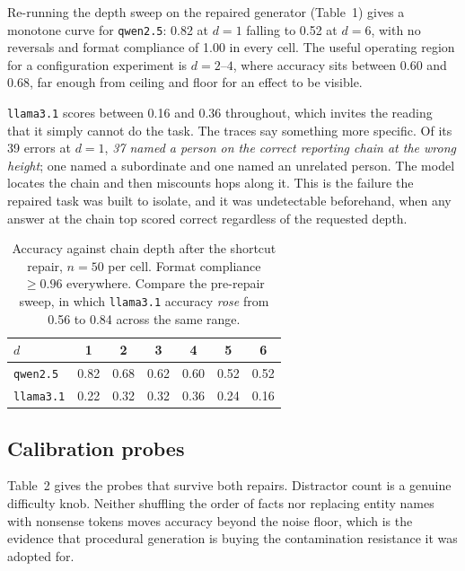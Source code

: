 \documentclass[10pt,twocolumn]{article}
\begin{document}
Re-running the depth sweep on the repaired generator (Table~1) gives a monotone curve for
\texttt{qwen2.5}: 0.82 at $d{=}1$ falling to 0.52 at $d{=}6$, with no reversals and format
compliance of 1.00 in every cell. The useful operating region for a configuration experiment is
$d = 2\text{--}4$, where accuracy sits between 0.60 and 0.68, far enough from ceiling and floor for
an effect to be visible.

\texttt{llama3.1} scores between 0.16 and 0.36 throughout, which invites the reading that it simply
cannot do the task. The traces say something more specific. Of its 39 errors at $d{=}1$, \emph{37
named a person on the correct reporting chain at the wrong height}; one named a subordinate and one
named an unrelated person. The model locates the chain and then miscounts hops along it. This is
the failure the repaired task was built to isolate, and it was undetectable beforehand, when any
answer at the chain top scored correct regardless of the requested depth.

\begin{table}[t]
\centering\small
\begin{tabular}{@{}lcccccc@{}}
\toprule
$d$ & 1 & 2 & 3 & 4 & 5 & 6\\
\midrule
\texttt{qwen2.5} & 0.82 & 0.68 & 0.62 & 0.60 & 0.52 & 0.52\\
\texttt{llama3.1} & 0.22 & 0.32 & 0.32 & 0.36 & 0.24 & 0.16\\
\bottomrule
\end{tabular}
\caption{Accuracy against chain depth after the shortcut repair, $n = 50$ per cell. Format
compliance $\geq 0.96$ everywhere. Compare the pre-repair sweep, in which \texttt{llama3.1}
accuracy \emph{rose} from 0.56 to 0.84 across the same range.}
\end{table}

\subsection{Calibration probes}

Table~2 gives the probes that survive both repairs. Distractor count is a genuine difficulty knob.
Neither shuffling the order of facts nor replacing entity names with nonsense tokens moves accuracy
beyond the noise floor, which is the evidence that procedural generation is buying the contamination
resistance it was adopted for.
\end{document}
